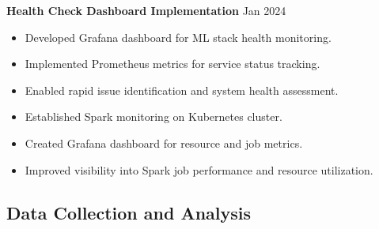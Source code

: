 \documentclass[a4paper,10pt]{article}
\begin{document}
\textbf{Health Check Dashboard Implementation} \hfill Jan 2024
\begin{itemize}[noitemsep, topsep=0pt]
    \item Developed Grafana dashboard for ML stack health monitoring.
    \item Implemented Prometheus metrics for service status tracking.
    \item Enabled rapid issue identification and system health assessment.
\end{itemize}
\begin{itemize}[noitemsep, topsep=0pt]
    \item Established Spark monitoring on Kubernetes cluster.
    \item Created Grafana dashboard for resource and job metrics.
    \item Improved visibility into Spark job performance and resource utilization.
\end{itemize}

\subsection*{Data Collection and Analysis}
\end{document}
